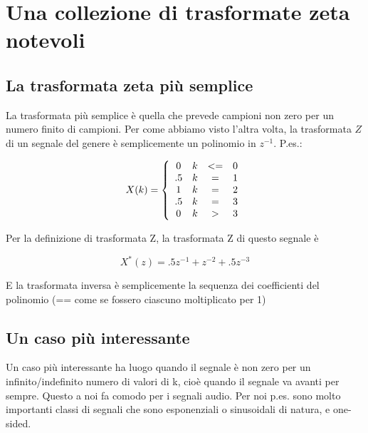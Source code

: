 \section{Una collezione di trasformate zeta notevoli\label{sec:zeta notevoli}}

\subsection{La trasformata zeta pi\`u semplice}

		La trasformata pi\`u semplice \`e quella che prevede campioni  non  zero  per  un
     numero finito di campioni. Per come abbiamo visto l'altra volta, la
     trasformata  $Z$  di  un  segnale  del  genere  \`e  semplicemente  un
     polinomio in $z^{-1}$. P.es.:

		 \begin{equation}
				X(k) = \left\{
					\begin{array}{c c c c}
						0 & k & <= & 0\\
						.5 & k & = & 1\\
						1 & k & = & 2\\
						.5 & k & = & 3\\
						0 & k & > & 3\\
		\end{array} \right.
		 \end{equation}

     Per la definizione di trasformata Z, la trasformata Z di questo segnale \`e

		 \begin{equation}
	   	 X^{*}(z) = .5z^{-1} + z^{-2} + .5z^{-3}
		 \end{equation}

     E la trasformata inversa \`e semplicemente la sequenza dei coefficienti del
     polinomio (== come se fossero ciascuno moltiplicato per 1)

\subsection{Un caso pi\`u interessante}

Un caso pi\`u interessante ha luogo quando il segnale \`e non  zero  per
    un infinito/indefinito numero  di  valori  di  k,  cio\`e  quando  il
    segnale va avanti per sempre. Questo a noi fa comodo per i segnali audio.
    Per noi p.es. sono molto importanti classi di segnali che sono
    esponenziali o sinusoidali di natura, e one-sided.


